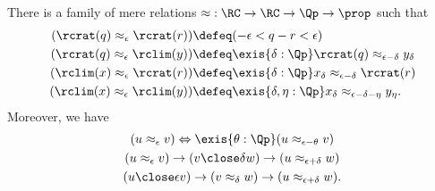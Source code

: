 %
\begin{thm}\label{defn:RC-approx}
  There is a family of mere relations $\mathord\approx:\RC\to\RC\to\Qp\to\prop$ such that
  \begin{align}
    (\rcrat(q) \approx_\epsilon \rcrat(r))  &\defeq
    (-\epsilon < q - r < \epsilon)\label{eq:RCappx1}\\
    (\rcrat(q) \approx_\epsilon \rclim(y)) &\defeq
    \exis{\delta : \Qp} \rcrat(q) \approx_{\epsilon - \delta} y_\delta\label{eq:RCappx2}\\
    (\rclim(x) \approx_\epsilon \rcrat(r)) &\defeq
    \exis{\delta : \Qp} x_\delta \approx_{\epsilon - \delta} \rcrat(r)\label{eq:RCappx3}\\
    (\rclim(x) \approx_\epsilon \rclim(y)) &\defeq
    \exis{\delta, \eta : \Qp} x_\delta \approx_{\epsilon - \delta - \eta} y_\eta.\label{eq:RCappx4}
  \end{align}
  Moreover, we have
  \begin{gather}
    (u \approx_\epsilon v) \Leftrightarrow \exis{\theta:\Qp} (u \approx_{\epsilon-\theta} v) \label{RC-sim-rounded}\\
    (u \approx_\epsilon v) \to (v\close\delta w) \to (u\approx_{\epsilon+\delta} w)\label{eq:RC-sim-rtri}\\
    (u \close\epsilon v) \to (v\approx_\delta w) \to (u\approx_{\epsilon+\delta} w)\label{eq:RC-sim-ltri}.
  \end{gather}
\end{thm}

